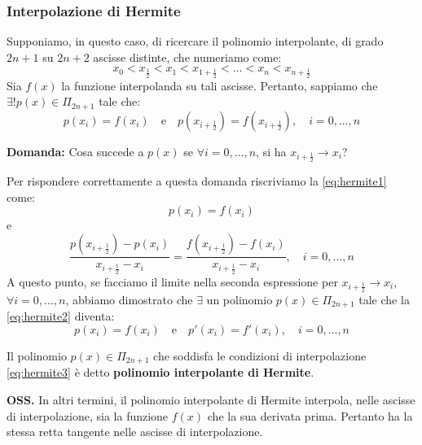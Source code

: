 \subsubsection{Interpolazione di Hermite}
Supponiamo, in questo caso, di ricercare il polinomio interpolante, di grado $2n+1$ su $2n+2$ ascisse distinte, che numeriamo come:
$$ x_0 < x_{\frac{1}{2}} < x_1 < x_{1+\frac{1}{2}} < \dots < x_n < x_{n+\frac{1}{2}} $$
Sia $f(x)$ la funzione interpolanda su tali ascisse. Pertanto, sappiamo che $\exists! p(x) \in \Pi_{2n+1}$ tale che:
\begin{equation} \label{eq:hermite1}
    p(x_i) = f(x_i) \quad \text{e} \quad p(x_{i+\frac{1}{2}}) = f(x_{i+\frac{1}{2}}), \quad i=0, \dots, n
\end{equation}

\textbf{Domanda:} Cosa succede a $p(x)$ se $\forall i=0, \dots, n$, si ha $x_{i+\frac{1}{2}} \to x_i$?

Per rispondere correttamente a questa domanda riscriviamo la \eqref{eq:hermite1} come:
$$ p(x_i) = f(x_i) $$
e
\begin{equation} \label{eq:hermite2}
    \frac{p(x_{i+\frac{1}{2}}) - p(x_i)}{x_{i+\frac{1}{2}} - x_i} = \frac{f(x_{i+\frac{1}{2}}) - f(x_i)}{x_{i+\frac{1}{2}} - x_i}, \quad i=0, \dots, n
\end{equation}
A questo punto, se facciamo il limite nella seconda espressione per $x_{i+\frac{1}{2}} \to x_i$, $\forall i=0, \dots, n$, abbiamo dimostrato che $\exists$ un polinomio $p(x) \in \Pi_{2n+1}$ tale che la \eqref{eq:hermite2} diventa:
\begin{equation} \label{eq:hermite3}
    p(x_i) = f(x_i) \quad \text{e} \quad p'(x_i) = f'(x_i), \quad i=0, \dots, n
\end{equation}

\vspace{0.4cm}
\begin{definition}
Il polinomio $p(x) \in \Pi_{2n+1}$ che soddisfa le condizioni di interpolazione \eqref{eq:hermite3} è detto \textbf{polinomio interpolante di Hermite}.
\end{definition}

\textbf{OSS.} In altri termini, il polinomio interpolante di Hermite interpola, nelle ascisse di interpolazione, sia la funzione $f(x)$ che la sua derivata prima. Pertanto ha la stessa retta tangente nelle ascisse di interpolazione.

